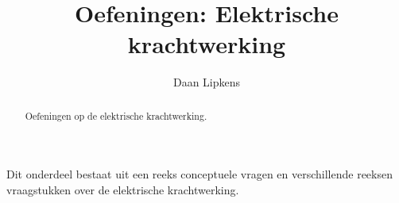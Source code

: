 \documentclass{ximera}
\title{Oefeningen: Elektrische krachtwerking}
\author{Daan Lipkens}
\begin{document}
\begin{abstract}
    Oefeningen op de elektrische krachtwerking.
\end{abstract}
\maketitle


Dit onderdeel bestaat uit een reeks conceptuele vragen en verschillende reeksen vraagstukken over de elektrische krachtwerking.
\end{document}

